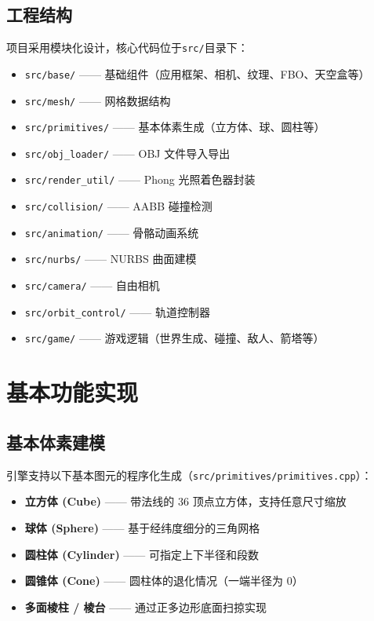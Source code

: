 \documentclass{article}
\begin{document}
\subsection{工程结构}
项目采用模块化设计，核心代码位于\texttt{src/}目录下：
\begin{itemize}[nosep]
    \item \texttt{src/base/} —— 基础组件（应用框架、相机、纹理、FBO、天空盒等）
    \item \texttt{src/mesh/} —— 网格数据结构
    \item \texttt{src/primitives/} —— 基本体素生成（立方体、球、圆柱等）
    \item \texttt{src/obj\_loader/} —— OBJ 文件导入导出
    \item \texttt{src/render\_util/} —— Phong 光照着色器封装
    \item \texttt{src/collision/} —— AABB 碰撞检测
    \item \texttt{src/animation/} —— 骨骼动画系统
    \item \texttt{src/nurbs/} —— NURBS 曲面建模
    \item \texttt{src/camera/} —— 自由相机
    \item \texttt{src/orbit\_control/} —— 轨道控制器
    \item \texttt{src/game/} —— 游戏逻辑（世界生成、碰撞、敌人、箭塔等）
\end{itemize}

\section{基本功能实现}

\subsection{基本体素建模}

引擎支持以下基本图元的程序化生成（\texttt{src/primitives/primitives.cpp}）：

\begin{itemize}[nosep]
    \item \textbf{立方体 (Cube)} —— 带法线的 36 顶点立方体，支持任意尺寸缩放
    \item \textbf{球体 (Sphere)} —— 基于经纬度细分的三角网格
    \item \textbf{圆柱体 (Cylinder)} —— 可指定上下半径和段数
    \item \textbf{圆锥体 (Cone)} —— 圆柱体的退化情况（一端半径为 0）
    \item \textbf{多面棱柱 / 棱台} —— 通过正多边形底面扫掠实现
\end{itemize}
\end{document}
